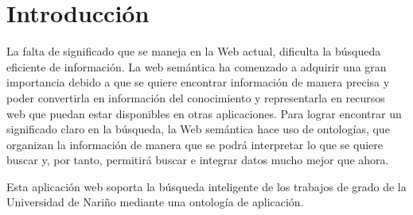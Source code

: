 
\chapter{Introducción}

La falta de significado que se maneja en la Web actual, dificulta la 
búsqueda eficiente de información. La web semántica ha comenzado a adquirir una
gran importancia debido a que se quiere encontrar información de manera precisa  y 
poder convertirla en información del conocimiento y representarla en recursos web que
puedan estar disponibles en otras aplicaciones. Para lograr encontrar un significado
claro en la búsqueda,  la Web semántica hace uso de ontologías, que organizan la 
información de manera que se podrá interpretar lo que se quiere buscar y, por tanto, 
permitirá buscar e integrar datos mucho mejor que ahora.

Esta aplicación web soporta la búsqueda
inteligente de los trabajos de grado de la Universidad de Nariño mediante una ontología
de aplicación.